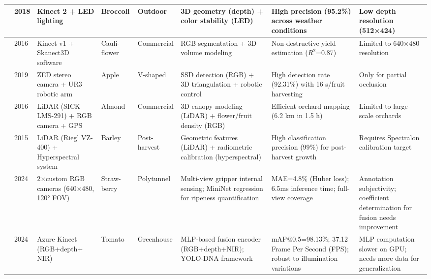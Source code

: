 \documentclass[a4paper,fleqn]{cas-dc}
\begin{document}
\begin{table}[ht]
\begin{tabular}{p{}p{}p{}p{}p{}p{}p{}p{}}
\hline
\cite{kusumam20173d} & 2018 & Kinect 2 + LED lighting & Broccoli & Outdoor & 3D geometry (depth) + color stability (LED) & High precision (95.2\%) across weather conditions & Low depth resolution (512×424)  \\ 
\hline
\cite{andujar2016using} & 2016 & Kinect v1 + Skanect3D software & Cauli- flower & Commercial & RGB segmentation + 3D volume modeling & Non-destructive yield estimation ($R^2$=0.87) & Limited to 640×480 resolution \\ 
\hline
\cite{onishi2019automated} & 2019 & ZED stereo camera + UR3 robotic arm & Apple & V-shaped & SSD detection (RGB) + 3D triangulation + robotic control & High detection rate (92.31\%) with 16 s/fruit harvesting & Only for partial occlusion \\ 
\hline
\cite{underwood2016mapping} & 2016 & LiDAR (SICK LMS-291) + RGB camera + GPS & Almond & Commercial & 3D canopy modeling (LiDAR) + flower/fruit density (RGB) & Efficient orchard mapping (6.2 km in 1.5 h) & Limited to large-scale orchards  \\ 
\hline
\cite{koenig2015comparative} & 2015 & LiDAR (Riegl VZ-400) + Hyperspectral system & Barley & Post-harvest & Geometric features (LiDAR) + radiometric calibration (hyperspectral) & High classification precision (99\%) for post-harvest growth & Requires Spectralon calibration target  \\ 
\hline
\cite{ge2024multi} & 2024 & 2×custom RGB cameras (640×480, 120° FOV) & Straw- berry & Polytunnel & Multi-view gripper internal sensing; MiniNet regression for ripeness quantification & MAE=4.8\% (Huber loss); 6.5ms inference time; full-view coverage & Annotation subjectivity; coefficient determination for fusion needs improvement \\
\hline
\cite{chen2024mlp} & 2024 & Azure Kinect (RGB+depth+ NIR) & Tomato & Greenhouse & MLP-based fusion encoder (RGB+depth+NIR); YOLO-DNA framework & mAP@0.5=98.13\%; 37.12 Frame Per Second (FPS); robust to illumination variations & MLP computation slower on GPU; needs more data for generalization  \\
\hline
\end{tabular}
\end{table}
\end{document}
